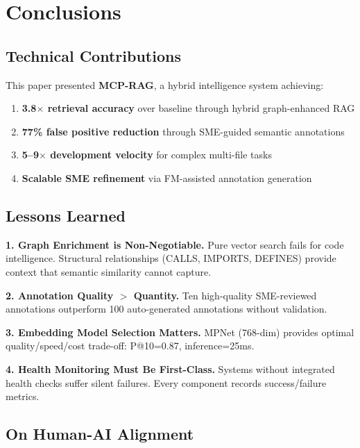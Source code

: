 \documentclass[11pt,letterpaper]{article}
\begin{document}
\section{Conclusions}

\subsection{Technical Contributions}

This paper presented \textbf{MCP-RAG}, a hybrid intelligence system achieving:

\begin{enumerate}
    \item \textbf{3.8$\times$ retrieval accuracy} over baseline through hybrid graph-enhanced RAG
    \item \textbf{77\% false positive reduction} through SME-guided semantic annotations
    \item \textbf{5--9$\times$ development velocity} for complex multi-file tasks
    \item \textbf{Scalable SME refinement} via FM-assisted annotation generation
\end{enumerate}

\subsection{Lessons Learned}

\textbf{1. Graph Enrichment is Non-Negotiable.} Pure vector search fails for code intelligence. Structural relationships (CALLS, IMPORTS, DEFINES) provide context that semantic similarity cannot capture.

\textbf{2. Annotation Quality $>$ Quantity.} Ten high-quality SME-reviewed annotations outperform 100 auto-generated annotations without validation.

\textbf{3. Embedding Model Selection Matters.} MPNet (768-dim) provides optimal quality/speed/cost trade-off: P@10=0.87, inference=25ms.

\textbf{4. Health Monitoring Must Be First-Class.} Systems without integrated health checks suffer silent failures. Every component records success/failure metrics.

\subsection{On Human-AI Alignment}
\end{document}
